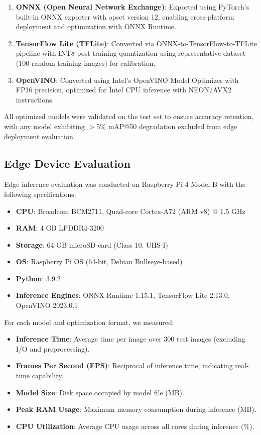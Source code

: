 \begin{enumerate}
\item \textbf{ONNX (Open Neural Network Exchange)}: Exported using PyTorch's built-in ONNX exporter with opset version 12, enabling cross-platform deployment and optimization with ONNX Runtime.

\item \textbf{TensorFlow Lite (TFLite)}: Converted via ONNX-to-TensorFlow-to-TFLite pipeline with INT8 post-training quantization using representative dataset (100 random training images) for calibration.

\item \textbf{OpenVINO}: Converted using Intel's OpenVINO Model Optimizer with FP16 precision, optimized for Intel CPU inference with NEON/AVX2 instructions.
\end{enumerate}

All optimized models were validated on the test set to ensure accuracy retention, with any model exhibiting $>$5\% mAP@50 degradation excluded from edge deployment evaluation.

\subsection{Edge Device Evaluation}

Edge inference evaluation was conducted on Raspberry Pi 4 Model B with the following specifications:

\begin{itemize}
\item \textbf{CPU}: Broadcom BCM2711, Quad-core Cortex-A72 (ARM v8) @ 1.5 GHz
\item \textbf{RAM}: 4 GB LPDDR4-3200
\item \textbf{Storage}: 64 GB microSD card (Class 10, UHS-I)
\item \textbf{OS}: Raspberry Pi OS (64-bit, Debian Bullseye-based)
\item \textbf{Python}: 3.9.2
\item \textbf{Inference Engines}: ONNX Runtime 1.15.1, TensorFlow Lite 2.13.0, OpenVINO 2023.0.1
\end{itemize}

For each model and optimization format, we measured:

\begin{itemize}
\item \textbf{Inference Time}: Average time per image over 300 test images (excluding I/O and preprocessing).
\item \textbf{Frames Per Second (FPS)}: Reciprocal of inference time, indicating real-time capability.
\item \textbf{Model Size}: Disk space occupied by model file (MB).
\item \textbf{Peak RAM Usage}: Maximum memory consumption during inference (MB).
\item \textbf{CPU Utilization}: Average CPU usage across all cores during inference (\%).
\end{itemize}

